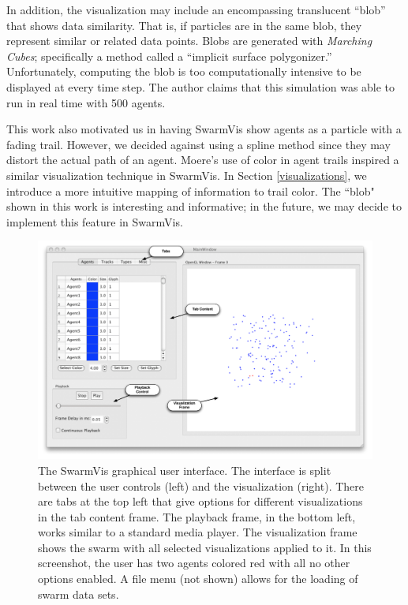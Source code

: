 \documentclass{vgtc}
\begin{document}
In addition, the visualization may include an encompassing translucent ``blob'' that shows data similarity.
That is, if particles are in the same blob, they represent similar or related data points.
Blobs are generated with {\em Marching Cubes}\cite{37422}; specifically a method called a ``implicit surface polygonizer.''
Unfortunately, computing the blob is too computationally intensive to be displayed at every time step.
The author claims that this simulation was able to run in real time with 500 agents.

This work also motivated us in having SwarmVis show agents as a particle with a fading trail.
However, we decided against using a spline method since they may distort the actual path of an agent.
Moere's use of color in agent trails inspired a similar visualization technique in SwarmVis.
In Section \ref{visualizations}, we introduce a more intuitive mapping of information to trail color.
The ``blob" shown in this work is interesting and informative;
in the future, we may decide to implement this feature in SwarmVis.


\begin{figure}[ht]
\centering
\includegraphics[scale=.45]{images/swarmvis-annotated.pdf}
\caption{The SwarmVis graphical user interface. 
The interface is split between the user controls (left) and the visualization (right).
There are tabs at the top left that give options for different visualizations in the tab content frame.
The playback frame, in the bottom left, works similar to a standard media player.
The visualization frame shows the swarm with all selected visualizations applied to it.
In this screenshot, the user has two agents colored red with all no other options enabled.
A file menu (not shown) allows for the loading of swarm data sets.}
\label{AnnotatedWindow}
\end{figure}
\end{document}
